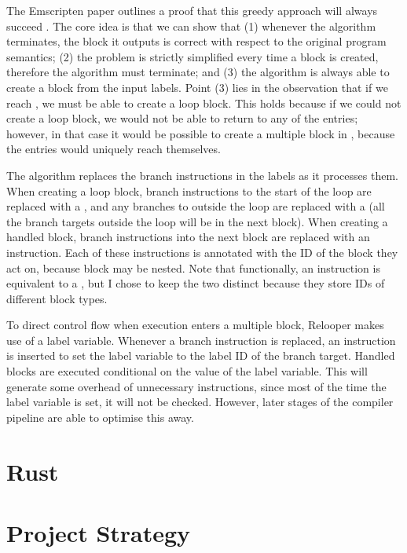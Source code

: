 \documentclass[00-main.tex]{subfiles}
\begin{document}
The Emscripten paper outlines a proof that this greedy approach will always succeed .
The core idea is that we can show that (1) whenever the algorithm terminates, the block it outputs is correct with respect to the original program semantics; (2) the problem is strictly simplified every time a block is created, therefore the algorithm must terminate; and (3) the algorithm is always able to create a block from the input labels.
Point (3) lies in the observation that if we reach , we must be able to create a loop block.
This holds because if we could not create a loop block, we would not be able to return to any of the entries; however, in that case it would be possible to create a multiple block in , because the entries would uniquely reach themselves.

The algorithm replaces the branch instructions in the labels as it processes them.
When creating a loop block, branch instructions to the start of the loop are replaced with a , and any branches to outside the loop are replaced with a  (all the branch targets outside the loop will be in the next block).
When creating a handled block, branch instructions into the next block are replaced with an  instruction.
Each of these instructions is annotated with the ID of the block they act on, because block may be nested.
Note that functionally, an  instruction is equivalent to a , but I chose to keep the two distinct because they store IDs of different block types.

To direct control flow when execution enters a multiple block, Relooper makes use of a label variable.
Whenever a branch instruction is replaced, an instruction is inserted to set the label variable to the label ID of the branch target.
Handled blocks are executed conditional on the value of the label variable.
This will generate some overhead of unnecessary instructions, since most of the time the label variable is set, it will not be checked.
However, later stages of the compiler pipeline are able to optimise this away.


\section{Rust}


\section{Project Strategy}
\end{document}
